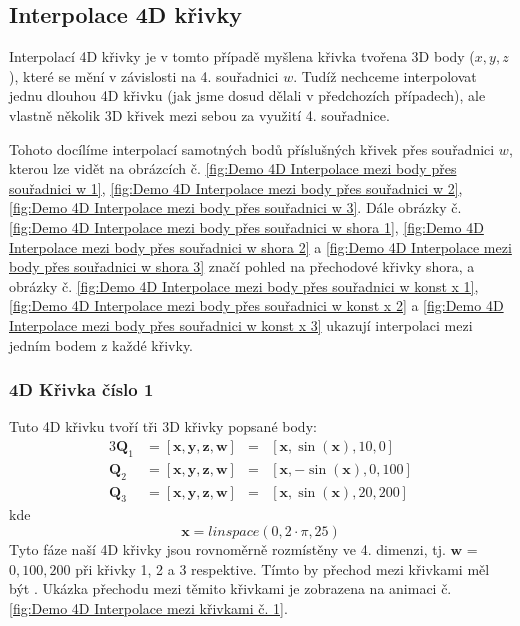 \subsection{Interpolace 4D křivky}
Interpolací 4D křivky je v tomto případě myšlena křivka tvořena 3D body ($x, y,
    z$), které se mění v závislosti na 4. souřadnici $w$. Tudíž nechceme
interpolovat jednu dlouhou 4D křivku (jak jsme dosud dělali v předchozích
případech), ale vlastně několik 3D křivek mezi sebou za využití 4.
souřadnice.\par Tohoto docílíme interpolací samotných bodů příslušných křivek
přes souřadnici $w$, kterou lze vidět na obrázcích č. \ref{fig:Demo 4D
    Interpolace mezi body přes souřadnici w 1}, \ref{fig:Demo 4D Interpolace mezi
    body přes souřadnici w 2}, \ref{fig:Demo 4D Interpolace mezi body přes
    souřadnici w 3}. Dále obrázky č. \ref{fig:Demo 4D Interpolace mezi body přes
    souřadnici w shora 1}, \ref{fig:Demo 4D Interpolace mezi body přes souřadnici w
    shora 2} a \ref{fig:Demo 4D Interpolace mezi body přes souřadnici w shora 3}
značí pohled na přechodové křivky shora, a obrázky č. \ref{fig:Demo 4D
    Interpolace mezi body přes souřadnici w konst x 1}, \ref{fig:Demo 4D
    Interpolace mezi body přes souřadnici w konst x 2} a \ref{fig:Demo 4D
    Interpolace mezi body přes souřadnici w konst x 3} ukazují interpolaci mezi
jedním bodem z každé křivky.

\subsubsection{4D Křivka číslo 1}
Tuto 4D křivku tvoří tři 3D křivky popsané body:
\begin{alignat}{3}
    \bm{Q}_1 & = [\bm{x}, \bm{y}, \bm{z}, \bm{w}] & = & [\bm{x}, \sin(\bm{x}), 10, 0]   \\
    \bm{Q}_2 & = [\bm{x}, \bm{y}, \bm{z}, \bm{w}] & = & [\bm{x}, -\sin(\bm{x}), 0, 100] \\
    \bm{Q}_3 & = [\bm{x}, \bm{y}, \bm{z}, \bm{w}] & = & [\bm{x}, \sin(\bm{x}), 20, 200]
\end{alignat}
kde
\begin{equation}
    \bm{x} = linspace(0, 2\cdot\pi, 25)
\end{equation}
Tyto fáze naší 4D křivky jsou rovnoměrně rozmístěny ve 4. dimenzi, tj.
$\bm{w}$ = $0, 100, 200$ při křivky 1, 2 a 3 respektive. Tímto by přechod mezi křivkami měl
být . Ukázka přechodu mezi těmito křivkami je
zobrazena na animaci č. \ref{fig:Demo 4D Interpolace mezi křivkami č. 1}.
